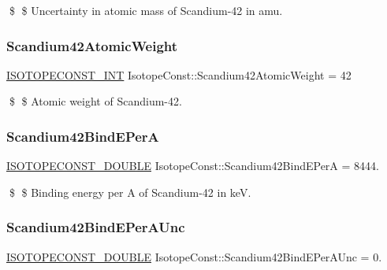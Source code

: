 \$ \$ Uncertainty in atomic mass of Scandium-\/42 in amu. \mbox{\label{group___isotope_const-_scandium-_sc42_ga31c4b24bfc52c217be1cd32d54504146}} 
\subsubsection{\texorpdfstring{Scandium42\+Atomic\+Weight}{Scandium42AtomicWeight}}
{\footnotesize\ttfamily \mbox{\hyperlink{group___isotope_const-_macros_ga5f18360b3e99483a35c32d789e62621c}{I\+S\+O\+T\+O\+P\+E\+C\+O\+N\+S\+T\+\_\+\+I\+NT}} Isotope\+Const\+::\+Scandium42\+Atomic\+Weight = 42}

\$ \$ Atomic weight of Scandium-\/42. \mbox{\label{group___isotope_const-_scandium-_sc42_gaddfd5001c75eff5954fad109b294e7f6}} 
\subsubsection{\texorpdfstring{Scandium42\+Bind\+E\+PerA}{Scandium42BindEPerA}}
{\footnotesize\ttfamily \mbox{\hyperlink{group___isotope_const-_macros_ga8f45a7272ce02c0b4c65c44636ed719a}{I\+S\+O\+T\+O\+P\+E\+C\+O\+N\+S\+T\+\_\+\+D\+O\+U\+B\+LE}} Isotope\+Const\+::\+Scandium42\+Bind\+E\+PerA = 8444.}

\$ \$ Binding energy per A of Scandium-\/42 in keV. \mbox{\label{group___isotope_const-_scandium-_sc42_gafec544047db4bbb6928e49310ac0635b}} 
\subsubsection{\texorpdfstring{Scandium42\+Bind\+E\+Per\+A\+Unc}{Scandium42BindEPerAUnc}}
{\footnotesize\ttfamily \mbox{\hyperlink{group___isotope_const-_macros_ga8f45a7272ce02c0b4c65c44636ed719a}{I\+S\+O\+T\+O\+P\+E\+C\+O\+N\+S\+T\+\_\+\+D\+O\+U\+B\+LE}} Isotope\+Const\+::\+Scandium42\+Bind\+E\+Per\+A\+Unc = 0.}

